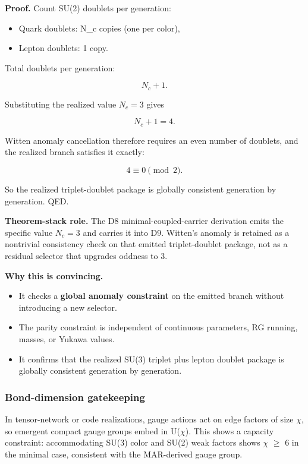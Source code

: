 \textbf{Proof.} Count SU(2) doublets per generation:

\begin{itemize}
\tightlist
\item
  Quark doublets: N\_c copies (one per color),
\item
  Lepton doublets: 1 copy.
\end{itemize}

Total doublets per generation:

\[
N_c + 1.
\]

Substituting the realized value \(N_c=3\) gives

\[
N_c+1=4.
\]

Witten anomaly cancellation therefore requires an even number of doublets, and the realized branch satisfies it exactly:

\[
4 \equiv 0 \pmod{2}.
\]

So the realized triplet-doublet package is globally consistent generation by generation. QED.

\textbf{Theorem-stack role.} The D8 minimal-coupled-carrier derivation emits the specific value \(N_c=3\) and carries it into D9. Witten's anomaly is retained as a nontrivial consistency check on that emitted triplet-doublet package, not as a residual selector that upgrades oddness to \(3\).

\textbf{Why this is convincing.}

\begin{itemize}
\tightlist
\item
  It checks a \textbf{global anomaly constraint} on the emitted branch without introducing a new selector.
\item
  The parity constraint is independent of continuous parameters, RG running, masses, or Yukawa values.
\item
  It confirms that the realized SU(3) triplet plus lepton doublet package is globally consistent generation by generation.
\end{itemize}

\subsubsection{Bond-dimension gatekeeping}\label{610-bond-dimension-gatekeeping}

In tensor-network or code realizations, gauge actions act on edge factors of size \ensuremath{\chi}, so emergent compact gauge groups embed in U(\ensuremath{\chi}). This shows a capacity constraint: accommodating SU(3) color and SU(2) weak factors shows \ensuremath{\chi} \ensuremath{\geq} 6 in the minimal case, consistent with the MAR-derived gauge group.


